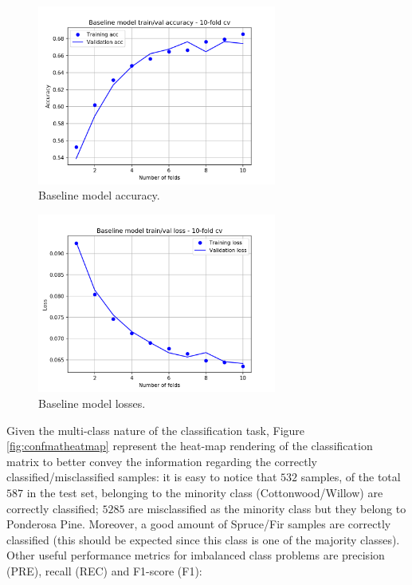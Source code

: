 \begin{figure}
\centering
\includegraphics[width=0.7\textwidth]{./TeX_files/img/baselinemodelacc.png}
\caption{Baseline model accuracy.}
\label{fig:baselinemodelacc}
\end{figure}
\begin{figure}
\centering
\includegraphics[width=0.7\textwidth]{./TeX_files/img/baselinemodelloss.png}
\caption{Baseline model losses.}
\label{fig:baselinemodelloss}
\end{figure}
Given the multi-class nature of the classification task, Figure \ref{fig:confmatheatmap} represent the heat-map rendering of the classification matrix to better convey the information regarding the correctly classified/misclassified samples: it is easy to notice that $532$ samples, of the total $587$ in the test set, belonging to the minority class (Cottonwood/Willow) are correctly classified; $5285$ are misclassified as the minority class but they belong to Ponderosa Pine. Moreover, a good amount of Spruce/Fir samples are correctly classified (this should be expected since this class is one of the majority classes). Other useful performance metrics for imbalanced class problems are precision (PRE), recall (REC) and F1-score (F1):
